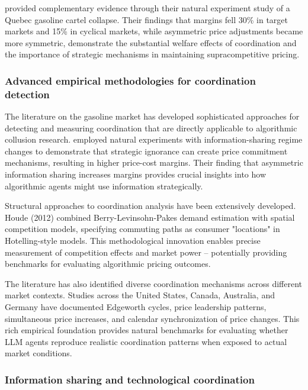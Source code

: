 \textcite{clark_effect_2014} provided complementary evidence through their natural experiment study of a Quebec gasoline cartel collapse. Their findings that margins fell 30\% in target markets and 15\% in cyclical markets, while asymmetric price adjustments became more symmetric, demonstrate the substantial welfare effects of coordination and the importance of strategic mechanisms in maintaining supracompetitive pricing.

\subsubsection*{Advanced empirical methodologies for coordination detection}

The literature on the gasoline market has developed sophisticated approaches for detecting and measuring coordination that are directly applicable to algorithmic collusion research. \textcite{byrne_learning_2019} employed natural experiments with information-sharing regime changes to demonstrate that strategic ignorance can create price commitment mechanisms, resulting in higher price-cost margins. Their finding that asymmetric information sharing increases margins provides crucial insights into how algorithmic agents might use information strategically.

Structural approaches to coordination analysis have been extensively developed. Houde (2012) combined Berry-Levinsohn-Pakes demand estimation with spatial competition models, specifying commuting paths as consumer "locations" in Hotelling-style models. This methodological innovation enables precise measurement of competition effects and market power -- potentially providing benchmarks for evaluating algorithmic pricing outcomes.

The literature has also identified diverse coordination mechanisms across different market contexts. Studies across the United States, Canada, Australia, and Germany have documented Edgeworth cycles, price leadership patterns, simultaneous price increases, and calendar synchronization of price changes. This rich empirical foundation provides natural benchmarks for evaluating whether LLM agents reproduce realistic coordination patterns when exposed to actual market conditions.

\subsubsection*{Information sharing and technological coordination}

